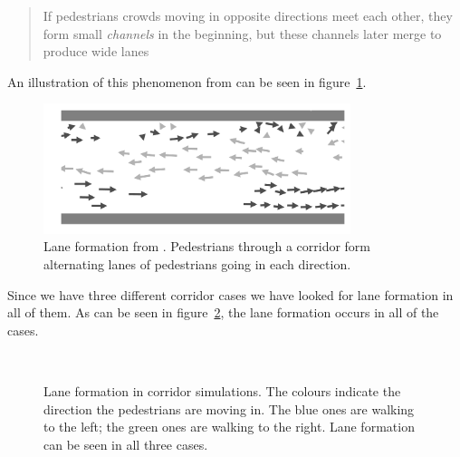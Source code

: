\begin{quote}
    If pedestrians crowds moving in opposite directions meet each other, they 
    form small \emph{channels} in the beginning, but these channels later 
    merge to produce wide lanes
\end{quote}

An illustration of this phenomenon from \cite{lanes} can be seen in 
figure~\ref{fig:lanes-literature}. 

\begin{figure}[h]
    \centering
    \includegraphics[width=0.8\textwidth]{Figures/flow_lanes_litterature.png}
    \caption[Lane formation from \cite{lanes}]{Lane formation from 
    \cite{lanes}. Pedestrians through a corridor form alternating lanes of 
    pedestrians going in each direction.}
    \label{fig:lanes-literature}
\end{figure}

Since we have three different corridor cases we have looked for lane
formation in all of them. As can be seen in figure~\ref{fig:laneformation}, 
the lane formation occurs in all of the cases.

\begin{figure}[h]
    \centering
    \\
    \caption[Lane formation in corridor simulations]{Lane formation in 
    corridor simulations. The colours indicate the direction the pedestrians 
    are moving in. The blue ones are walking to the left; the green ones 
    are walking to the right. Lane formation can be seen in all three cases. }
    \label{fig:laneformation}
\end{figure}

